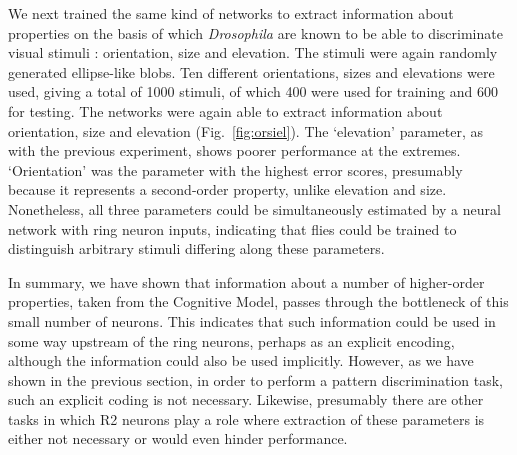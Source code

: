 We next trained the same kind of networks to extract information about properties on the basis of which \emph{Drosophila} are known to be able to discriminate visual stimuli \cite{Pan2009,Liu2006,Ernst1999}: orientation, size and elevation.
The stimuli were again randomly generated ellipse-like blobs.
Ten different orientations, sizes and elevations were used, giving a total of 1000 stimuli, of which 400 were used for training and 600 for testing.
The networks were again able to extract information about orientation, size and elevation (Fig.~\ref{fig:orsiel}).
The `elevation' parameter, as with the previous experiment, shows poorer performance at the extremes.
`Orientation' was the parameter with the highest error scores, presumably because it represents a second-order property, unlike elevation and size.
Nonetheless, all three parameters could be simultaneously estimated by a neural network with ring neuron inputs, indicating that flies could be trained to distinguish arbitrary stimuli differing along these parameters.

In summary, we have shown that information about a number of higher-order properties, taken from the Cognitive Model, passes through the bottleneck of this small number of neurons.
This indicates that such information could be used in some way upstream of the ring neurons, perhaps as an explicit encoding, although the information could also be used implicitly.
However, as we have shown in the previous section, in order to perform a pattern discrimination task, such an explicit coding is not necessary.
Likewise, presumably there are other tasks in which R2 neurons play a role where extraction of these parameters is either not necessary or would even hinder performance.
